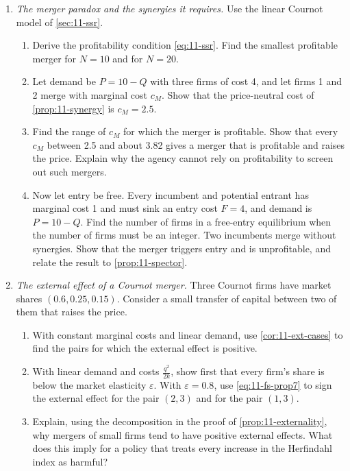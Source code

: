\begin{enumerate}[label=\arabic*., leftmargin=*, itemsep=6pt]
\item \emph{The merger paradox and the synergies it requires.} Use the linear Cournot model of \cref{sec:11-ssr}.
\begin{enumerate}[label=(\alph*)]
\item Derive the profitability condition \eqref{eq:11-ssr}. Find the smallest profitable merger for $N = 10$ and
for $N = 20$.
\item Let demand be $P = 10 - Q$ with three firms of cost 4, and let firms 1 and 2 merge with marginal cost $c_M$.
Show that the price-neutral cost of \cref{prop:11-synergy} is $c_M = 2.5$.
\item Find the range of $c_M$ for which the merger is profitable. Show that every $c_M$ between 2.5 and about 3.82
gives a merger that is profitable and raises the price. Explain why the agency cannot rely on profitability to
screen out such mergers.
\item Now let entry be free. Every incumbent and potential entrant has marginal cost 1 and must sink an entry cost
$F = 4$, and demand is $P = 10 - Q$. Find the number of firms in a free-entry equilibrium when the number of firms
must be an integer. Two incumbents merge without synergies. Show that the merger triggers entry and is unprofitable,
and relate the result to \cref{prop:11-spector}.
\end{enumerate}

\item \emph{The external effect of a Cournot merger.} Three Cournot firms have market shares $(0.6, 0.25, 0.15)$.
Consider a small transfer of capital between two of them that raises the price.
\begin{enumerate}[label=(\alph*)]
\item With constant marginal costs and linear demand, use \cref{cor:11-ext-cases} to find the pairs for which the
external effect is positive.
\item With linear demand and costs $\frac{q^2}{2k}$, show first that every firm's share is below the market
elasticity $\varepsilon$. With $\varepsilon = 0.8$, use \eqref{eq:11-fs-prop7} to sign the external effect for the
pair $(2,3)$ and for the pair $(1,3)$.
\item Explain, using the decomposition in the proof of \cref{prop:11-externality}, why mergers of small firms tend to
have positive external effects. What does this imply for a policy that treats every increase in the Herfindahl
index as harmful?
\end{enumerate}


\end{enumerate}
